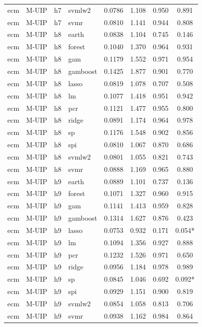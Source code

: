 \begin{ThreePartTable}
\begin{longtable}[t]{llclcccc}
ecm & M-UIP & h7 & svmlw2 & 0.0786 & 1.108 & 0.950 & 0.891\\
ecm & M-UIP & h7 & svmr & 0.0810 & 1.141 & 0.944 & 0.808\\
\addlinespace
ecm & M-UIP & h8 & earth & 0.0838 & 1.104 & 0.745 & 0.146\\
ecm & M-UIP & h8 & forest & 0.1040 & 1.370 & 0.964 & 0.931\\
ecm & M-UIP & h8 & gam & 0.1179 & 1.552 & 0.971 & 0.954\\
ecm & M-UIP & h8 & gamboost & 0.1425 & 1.877 & 0.901 & 0.770\\
ecm & M-UIP & h8 & lasso & 0.0819 & 1.078 & 0.707 & 0.508\\
ecm & M-UIP & h8 & lm & 0.1077 & 1.418 & 0.951 & 0.942\\
ecm & M-UIP & h8 & pcr & 0.1121 & 1.477 & 0.955 & 0.800\\
ecm & M-UIP & h8 & ridge & 0.0891 & 1.174 & 0.964 & 0.978\\
ecm & M-UIP & h8 & sp & 0.1176 & 1.548 & 0.902 & 0.856\\
ecm & M-UIP & h8 & spi & 0.0810 & 1.067 & 0.870 & 0.686\\
ecm & M-UIP & h8 & svmlw2 & 0.0801 & 1.055 & 0.821 & 0.743\\
ecm & M-UIP & h8 & svmr & 0.0888 & 1.169 & 0.965 & 0.880\\
\addlinespace
ecm & M-UIP & h9 & earth & 0.0889 & 1.101 & 0.737 & 0.136\\
ecm & M-UIP & h9 & forest & 0.1071 & 1.327 & 0.960 & 0.915\\
ecm & M-UIP & h9 & gam & 0.1141 & 1.413 & 0.959 & 0.828\\
ecm & M-UIP & h9 & gamboost & 0.1314 & 1.627 & 0.876 & 0.423\\
ecm & M-UIP & h9 & lasso & 0.0753 & 0.932 & 0.171 & 0.054*\\
ecm & M-UIP & h9 & lm & 0.1094 & 1.356 & 0.927 & 0.888\\
ecm & M-UIP & h9 & pcr & 0.1232 & 1.526 & 0.971 & 0.650\\
ecm & M-UIP & h9 & ridge & 0.0956 & 1.184 & 0.978 & 0.989\\
ecm & M-UIP & h9 & sp & 0.0845 & 1.046 & 0.692 & 0.092*\\
ecm & M-UIP & h9 & spi & 0.0929 & 1.151 & 0.900 & 0.819\\
ecm & M-UIP & h9 & svmlw2 & 0.0854 & 1.058 & 0.813 & 0.706\\
ecm & M-UIP & h9 & svmr & 0.0938 & 1.162 & 0.984 & 0.864\\

\end{longtable}
\end{ThreePartTable}
